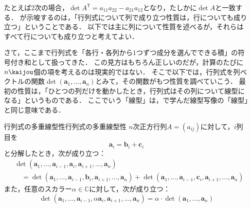 たとえば$2$次の場合，$\det A^\mathsf{T} = a_{11}a_{22} - a_{21}a_{12}$となり，たしかに$\det A$と一致する．
が示唆するのは，「行列式について列で成り立つ性質は，行についても成り立つ」ということである．
以下では主に列について性質を述べるが，それらはすべて行についても成り立つと考えてよい．

さて，ここまで行列式を「各行・各列から$1$つずつ成分を選んでできる積」の符号付き和として扱ってきた．
この見方はもちろん正しいのだが，計算のたびに$n\kaijou$個の項を考えるのは現実的ではない．
そこで以下では，行列式を列ベクトルの関数$\det(\bm{a}_1, \dots, \bm{a}_n)$とみて，その関数がもつ性質を調べていこう．
最初の性質は，「ひとつの列だけを動かしたとき，行列式はその列について線型になる」というものである．
ここでいう「線型」は，で学んだ線型写像の「線型」と同じ意味である．

\begin{prop}{行列式の多重線型性}{行列式の多重線型性}
  $n$次正方行列$A = (a_{ij})$に対して，$i$列目を
  \[
  \bm{a}_i = \bm{b}_i + \bm{c}_i
  \]
  と分解したとき，次が成り立つ：
  \begin{align*}
  &\det(\bm{a}_1, \dots, \bm{a}_{i-1}, \bm{a}_i, \bm{a}_{i+1}, \dots, \bm{a}_n) \\
  &\quad = \det(\bm{a}_1, \dots, \bm{a}_{i-1}, \bm{b}_i, \bm{a}_{i+1}, \dots, \bm{a}_n)
  + \det(\bm{a}_1, \dots, \bm{a}_{i-1}, \bm{c}_i, \bm{a}_{i+1}, \dots, \bm{a}_n)
  \end{align*}
  また，任意のスカラー$\alpha \in \mathbb{C}$に対して，次が成り立つ：
  \[
  \det(\bm{a}_1, \dots, \bm{a}_{i-1}, \alpha \bm{a}_i, \bm{a}_{i+1}, \dots, \bm{a}_n) 
  = \alpha \cdot \det(\bm{a}_1, \dots, \bm{a}_n)
  \]
\end{prop}

